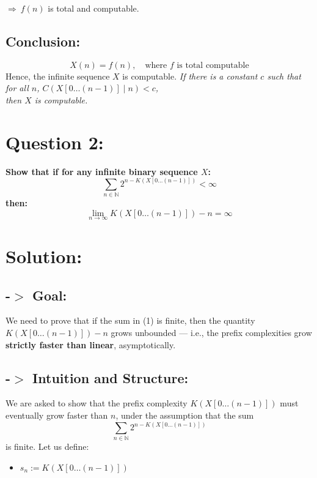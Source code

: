 \documentclass[12pt]{article}
\begin{document}
\(\Rightarrow\ f(n) \) is total and computable.

\subsection*{Conclusion:}
\[
X(n) = f(n),\quad \text{where } f \text{ is total computable}
\]
Hence, the infinite sequence \( X \) is computable.
\newline
\newline
\textit{If there is a constant \( c \) such that for all \( n \), \( C(X[0\ldots(n-1)] \mid n) < c \),\\
then \( X \) is computable.}

\newpage
\section*{Question 2:}

\noindent
\textbf{Show that if for any infinite binary sequence \( X \):}  
\[
\sum_{n \in \mathbb{N}} 2^{n - K(X[0\ldots(n-1)])} < \infty \tag{1}
\]
\textbf{then:}  
\[
\lim_{n \to \infty} K(X[0 \ldots (n-1)]) - n = \infty \tag{2}
\]

\section*{Solution:}
\subsection*{-$>$ Goal:}

We need to prove that if the sum in (1) is finite, then the quantity \( K(X[0\ldots(n-1)]) - n \) grows unbounded — i.e., the prefix complexities grow \textbf{strictly faster than linear}, asymptotically.

\subsection*{-$>$ Intuition and Structure:}

We are asked to show that the prefix complexity \( K(X[0\ldots(n-1)]) \) must eventually grow faster than \( n \), under the assumption that the sum  
\[
\sum_{n \in \mathbb{N}} 2^{n - K(X[0\ldots(n-1)])}
\]
is finite.
\newline
\newline
Let us define:
\begin{itemize}
  \item \( s_n := K(X[0\ldots(n-1)]) \)
\end{itemize}
\end{document}
